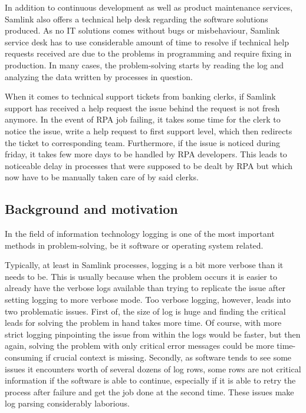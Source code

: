 In addition to continuous development
as well as product maintenance services,
Samlink also offers a technical help desk
regarding the software solutions produced.
As no IT solutions comes without bugs or misbehaviour,
Samlink service desk has to use considerable amount of time
to resolve if technical help requests received
are due to the problems in programming
and require fixing in production.
In many cases,
the problem-solving starts by reading the log
and analyzing the data written by processes in question.



When it comes to technical support tickets from banking clerks,
if Samlink support has received a help request
the issue behind the request is not fresh anymore.
In the event of RPA job failing,
it takes some time for the clerk to notice the issue,
write a help request to first support level,
which then redirects the ticket to corresponding team.
Furthermore,
if the issue is noticed during friday,
it takes few more days to be handled by RPA developers.
This leads to noticeable delay in processes
that were supposed to be dealt by RPA
but which now have to be manually taken care of
by said clerks.



\subsection{Background and motivation}\label{subsec:intro-background-and-motivation}
In the field of information technology
logging is one of the most important methods
in problem-solving,
be it software or operating system related.\cite{delarosa2018log}

Typically,
at least in Samlink processes,
logging is a bit more verbose
than it needs to be.
This is usually because when the problem occurs
it is easier to already have the verbose logs available
than trying to replicate the issue
after setting logging to more verbose mode.
Too verbose logging, however,
leads into two problematic issues.
First of, the size of log is huge
and finding the critical leads for
solving the problem in hand
takes more time.
Of course,
with more strict logging
pinpointing the issue from within the logs
would be faster,
but then again,
solving the problem with only critical error messages
could be more time-consuming
if crucial context is missing.
Secondly,
as software tends to see some issues it encounters
worth of several dozens of log rows,
some rows are not critical information
if the software is able to continue,
especially if it is able to retry the process after failure
and get the job done at the second time.
These issues make log parsing considerably laborious.


